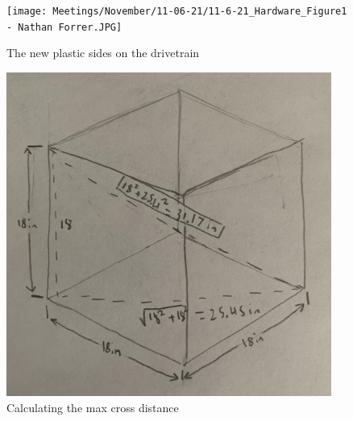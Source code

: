 \begin{figure}[ht]
\centering
\begin{minipage}[b]{.48\textwidth}
  \centering
  \texttt{[image: Meetings/November/11-06-21/11-6-21\_Hardware\_Figure1 - Nathan Forrer.JPG]}
  \caption{The new plastic sides on the drivetrain}
  \label{fig:pic1}
\end{minipage}%
\hfill%
\begin{minipage}[b]{.48\textwidth}
  \centering
  \includegraphics[width=0.95\textwidth]{Meetings/November/11-06-21/11-6-21_Hardware_Figure2 - Nathan Forrer.JPG}
  \caption{Calculating the max cross distance}
  \label{fig:pic2}
\end{minipage}
\end{figure}

